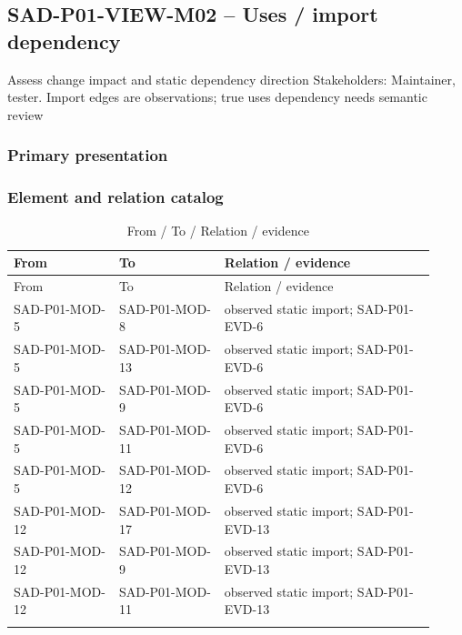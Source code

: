 \documentclass[10pt,letterpaper]{article}
\begin{document}
\subsection{SAD-P01-VIEW-M02 -- Uses / import dependency}
Assess change impact and static dependency direction Stakeholders: Maintainer, tester. Import edges are observations; true uses dependency needs semantic review
\subsubsection{Primary presentation}

\subsubsection{Element and relation catalog}
\begin{longtable}{@{}>{\raggedright\arraybackslash}p{0.23\linewidth}>{\raggedright\arraybackslash}p{0.23\linewidth}>{\raggedright\arraybackslash}p{0.46\linewidth}@{}}
\caption{From / To / Relation / evidence}\\
\toprule From & To & Relation / evidence\\\midrule\endfirsthead
\toprule From & To & Relation / evidence\\\midrule\endhead
SAD-P01-MOD-5 & SAD-P01-MOD-8 & observed static import; SAD-P01-EVD-6\\\addlinespace
SAD-P01-MOD-5 & SAD-P01-MOD-13 & observed static import; SAD-P01-EVD-6\\\addlinespace
SAD-P01-MOD-5 & SAD-P01-MOD-9 & observed static import; SAD-P01-EVD-6\\\addlinespace
SAD-P01-MOD-5 & SAD-P01-MOD-11 & observed static import; SAD-P01-EVD-6\\\addlinespace
SAD-P01-MOD-5 & SAD-P01-MOD-12 & observed static import; SAD-P01-EVD-6\\\addlinespace
SAD-P01-MOD-12 & SAD-P01-MOD-17 & observed static import; SAD-P01-EVD-13\\\addlinespace
SAD-P01-MOD-12 & SAD-P01-MOD-9 & observed static import; SAD-P01-EVD-13\\\addlinespace
SAD-P01-MOD-12 & SAD-P01-MOD-11 & observed static import; SAD-P01-EVD-13\\\addlinespace
\bottomrule\end{longtable}
\end{document}
